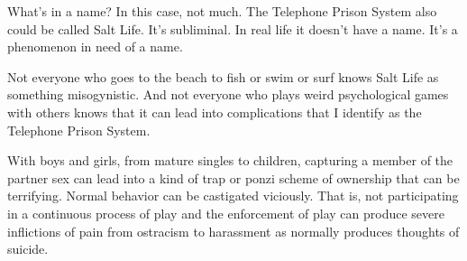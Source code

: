 

What's in a name?  In this case, not much.  The Telephone Prison
System also could be called Salt Life.  It's subliminal.  In real life
it doesn't have a name.  It's a phenomenon in need of a name.  

Not everyone who goes to the beach to fish or swim or surf knows Salt
Life as something misogynistic.  And not everyone who plays weird
psychological games with others knows that it can lead into
complications that I identify as the Telephone Prison System.

With boys and girls, from mature singles to children, capturing a
member of the partner sex can lead into a kind of trap or ponzi scheme
of ownership that can be terrifying.  Normal behavior can be
castigated viciously.  That is, not participating in a continuous
process of play and the enforcement of play can produce severe
inflictions of pain from ostracism to harassment as normally produces
thoughts of suicide.

\bye
